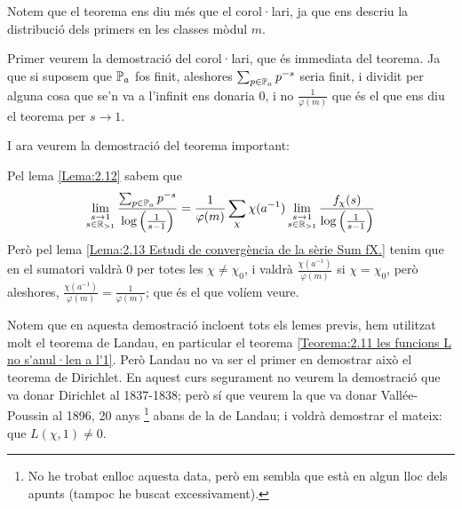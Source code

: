 Notem que el teorema ens diu més que el corol·lari, ja que ens descriu la distribució dels primers en les classes mòdul $m$.
\begin{pf}
    Primer veurem la demostració del corol·lari, que és immediata del teorema. Ja que si suposem que $\mathbb P_a$ fos finit, aleshores $\sum_{p\in\mathbb P_a} p^{-s}$ seria finit, i dividit per alguna cosa que se'n va a l'infinit ens donaria 0, i no $\frac{1}{\varphi(m)}$ que és el que ens diu el teorema per $s\to1$.
\end{pf}
I ara veurem la demostració del teorema important:
\begin{pf}
    Pel lema \ref{Lema:2.12} sabem que
    \[
    \lim_{\substack{s\to 1\\s\in \mathbb R_{>1}}}\frac{\sum_{p\in\mathbb P_a}p^{-s}}{\log\left(\frac{1}{s-1}\right)}=
    \frac{1}{\varphi(m)}
    \sum_\chi\chi(a^{-1})
    \lim_{\substack{s\to 1\\s\in \mathbb R_{>1}}}
    \frac{f_\chi(s)}{\log\left(\frac{1}{s-1}\right)}
    \]
    Però pel lema \ref{Lema:2.13 Estudi de convergència de la sèrie Sum fX.} tenim que en el sumatori valdrà $0$ per totes les $\chi\neq \chi_0$, i valdrà $\frac{\chi(a^{-1})}{\varphi(m)}$ si $\chi=\chi_0$, però aleshores, $\frac{\chi(a^{-1})}{\varphi(m)}=\frac{1}{\varphi(m)}$; que és el que volíem veure.
\end{pf}

Notem que en aquesta demostració incloent tots els lemes previs, hem utilitzat molt el teorema de Landau, en particular el teorema \ref{Teorema:2.11 les funcions L no s'anul·len a l'1}. Però Landau no va ser el primer en demostrar això el teorema de Dirichlet. En aquest curs segurament no veurem la demostració que va donar Dirichlet al 1837-1838; però sí que veurem la que va donar Vallée-Poussin al 1896, 20 anys \footnote{No he trobat enlloc aquesta data, però em sembla que està en algun lloc dels apunts (tampoc he buscat excessivament).} abans de la de Landau; i voldrà demostrar el mateix: que $L(\chi,1)\neq 0$. 
 

